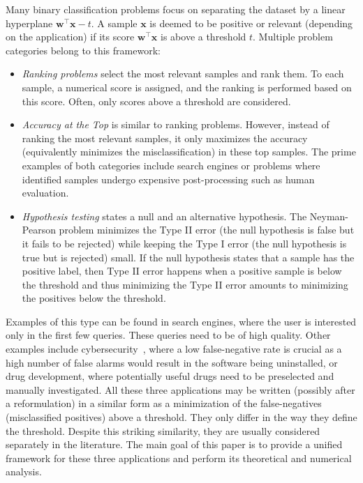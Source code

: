\documentclass{Thesis}
\begin{document}
Many binary classification problems focus on separating the dataset by a linear hyperplane $\bm{w}^\top \bm{x} - t$. A sample $\bm{x}$ is deemed to be positive or relevant (depending on the application) if its score $\bm{w}^\top \bm{x}$ is above a threshold $t$. Multiple problem categories belong to this framework:
\begin{itemize}
  \item \textit{Ranking problems} select the most relevant samples and rank them. To each sample, a numerical score is assigned, and the ranking is performed based on this score. Often, only scores above a threshold are considered.
  \item \textit{Accuracy at the Top} is similar to ranking problems. However, instead of ranking the most relevant samples, it only maximizes the accuracy (equivalently minimizes the misclassification) in these top samples. The prime examples of both categories include search engines or problems where identified samples undergo expensive post-processing such as human evaluation.
  \item \textit{Hypothesis testing} states a null and an alternative hypothesis. The Neyman-Pearson problem minimizes the Type II error (the null hypothesis is false but it fails to be rejected) while keeping the Type I error (the null hypothesis is true but is rejected) small. If the null hypothesis states that a sample has the positive label, then Type II error happens when a positive sample is below the threshold and thus minimizing the Type II error amounts to minimizing the positives below the threshold.
\end{itemize}
Examples of this type can be found in search engines, where the user is interested only in the first few queries. These queries need to be of high quality. Other examples include cybersecurity~\cite{Grill_2016}, where a low false-negative rate is crucial as a high number of false alarms would result in the software being uninstalled, or drug development, where potentially useful drugs need to be preselected and manually investigated. All these three applications may be written (possibly after a reformulation) in a similar form as a minimization of the false-negatives (misclassified positives) above a threshold. They only differ in the way they define the threshold. Despite this striking similarity, they are usually considered separately in the literature. The main goal of this paper is to provide a unified framework for these three applications and perform its theoretical and numerical analysis.
\end{document}
